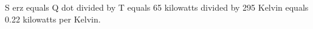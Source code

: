 S erz equals Q dot divided by T equals 65 kilowatts divided by 295 Kelvin equals 0.22 kilowatts per Kelvin.
